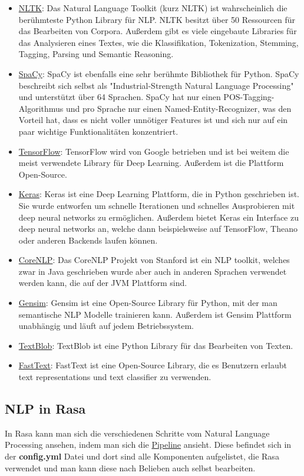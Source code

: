 \begin{itemize}
    \item \href{https://www.nltk.org/}{NLTK}: Das Natural Language Toolkit (kurz NLTK) ist wahrscheinlich die berühmteste Python Library für NLP. NLTK besitzt über 50 Ressourcen für das Bearbeiten von Corpora.
    Außerdem gibt es viele eingebaute Libraries für das Analysieren eines Textes, wie die Klassifikation, Tokenization, Stemming, Tagging, Parsing und Semantic Reasoning.
    \item \href{https://spacy.io/}{SpaCy}: SpaCy ist ebenfalls eine sehr berühmte Bibliothek für Python.
    SpaCy beschreibt sich selbst als "Industrial-Strength Natural Language Processing" und unterstützt über 64 Sprachen.
    SpaCy hat nur einen POS-Tagging-Algorithmus und pro Sprache nur einen Named-Entity-Recognizer, was den Vorteil hat, dass es nicht voller unnötiger Features ist und sich nur auf ein paar wichtige Funktionalitäten konzentriert.
    \item \href{https://www.tensorflow.org/}{TensorFlow}: TensorFlow wird von Google betrieben und ist bei weitem die meist verwendete Library für Deep Learning.
    Außerdem ist die Plattform Open-Source.
    \item \href{https://keras.io/}{Keras}: Keras ist eine Deep Learning Plattform, die in Python geschrieben ist.
    Sie wurde entworfen um schnelle Iterationen und schnelles Ausprobieren mit deep neural networks zu ermöglichen.
    Außerdem bietet Keras ein Interface zu deep neural networks an, welche dann beispielsweise auf TensorFlow, Theano oder anderen Backends laufen können.
    \item \href{https://stanfordnlp.github.io/CoreNLP/}{CoreNLP}: Das CoreNLP Projekt von Stanford ist ein NLP toolkit, welches zwar in Java geschrieben wurde aber auch in anderen Sprachen verwendet werden kann, die auf der JVM Plattform sind.
    \item \href{https://radimrehurek.com/gensim/}{Gensim}: Gensim ist eine Open-Source Library für Python, mit der man semantische NLP Modelle trainieren kann.
    Außerdem ist Gensim Plattform unabhängig und läuft auf jedem Betriebssystem.
    \item \href{https://textblob.readthedocs.io/en/dev/}{TextBlob}: TextBlob ist eine Python Library für das Bearbeiten von Texten.
    \item \href{https://fasttext.cc/}{FastText}: FastText ist eine Open-Source Library, die es Benutzern erlaubt text representations und text classifier zu verwenden.
\end{itemize}


\subsection{NLP in Rasa}

In Rasa kann man sich die verschiedenen Schritte vom Natural Language Processing ansehen, indem man sich die \hyperref[sec:pipeline]{Pipeline} ansieht.
Diese befindet sich in der \textbf{config.yml} Datei und dort sind alle Komponenten aufgelistet, die Rasa verwendet und man kann diese nach Belieben auch selbst bearbeiten.